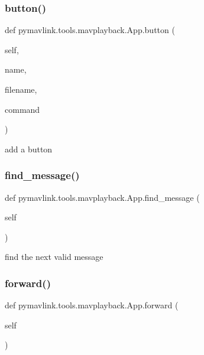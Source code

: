 \subsubsection{\texorpdfstring{button()}{button()}}
{\footnotesize\ttfamily def pymavlink.\+tools.\+mavplayback.\+App.\+button (\begin{DoxyParamCaption}\item[{}]{self,  }\item[{}]{name,  }\item[{}]{filename,  }\item[{}]{command }\end{DoxyParamCaption})}

\begin{DoxyVerb}add a button\end{DoxyVerb}
 \mbox{\label{classpymavlink_1_1tools_1_1mavplayback_1_1App_a51fb5db450ed3c0988122799a5cf2727}} 
\subsubsection{\texorpdfstring{find\+\_\+message()}{find\_message()}}
{\footnotesize\ttfamily def pymavlink.\+tools.\+mavplayback.\+App.\+find\+\_\+message (\begin{DoxyParamCaption}\item[{}]{self }\end{DoxyParamCaption})}

\begin{DoxyVerb}find the next valid message\end{DoxyVerb}
 \mbox{\label{classpymavlink_1_1tools_1_1mavplayback_1_1App_a09ac8360859a9b2e685612b6504fb951}} 
\subsubsection{\texorpdfstring{forward()}{forward()}}
{\footnotesize\ttfamily def pymavlink.\+tools.\+mavplayback.\+App.\+forward (\begin{DoxyParamCaption}\item[{}]{self }\end{DoxyParamCaption})}

